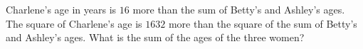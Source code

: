 Charlene's age in years is $16$ more than the sum of Betty's and Ashley's ages. The square of Charlene's age is $1632$ more than the square of the sum of Betty's and Ashley's ages. What is the sum of the ages of the three women?
